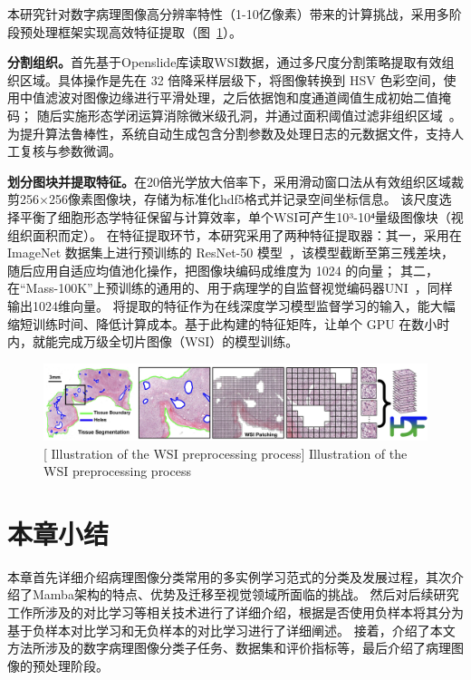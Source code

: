 本研究针对数字病理图像高分辨率特性（1-10亿像素）带来的计算挑战，采用多阶段预处理框架实现高效特征提取（图~\ref{figure1: 数字病理图像的预处理过程示意图}）。

\textbf{分割组织。}首先基于Openslide库读取WSI数据，通过多尺度分割策略提取有效组织区域。具体操作是先在 32 倍降采样层级下，将图像转换到 HSV 色彩空间，使用中值滤波对图像边缘进行平滑处理，之后依据饱和度通道阈值生成初始二值掩码；
随后实施形态学闭运算消除微米级孔洞，并通过面积阈值过滤非组织区域~\cite{lu2021data}。
为提升算法鲁棒性，系统自动生成包含分割参数及处理日志的元数据文件，支持人工复核与参数微调。

\textbf{划分图块并提取特征。}在20倍光学放大倍率下，采用滑动窗口法从有效组织区域裁剪256×256像素图像块，存储为标准化hdf5格式并记录空间坐标信息。
该尺度选择平衡了细胞形态学特征保留与计算效率，单个WSI可产生10³-10⁴量级图像块（视组织面积而定）。
在特征提取环节，本研究采用了两种特征提取器：其一，采用在 ImageNet 数据集上进行预训练的 ResNet-50 模型~\cite{he2016deep}，该模型截断至第三残差块，随后应用自适应均值池化操作，把图像块编码成维度为 1024 的向量；
其二， 在“Mass-100K”上预训练的通用的、用于病理学的自监督视觉编码器UNI~\cite{chen2024towards}，同样输出1024维向量。
将提取的特征作为在线深度学习模型监督学习的输入，能大幅缩短训练时间、降低计算成本。基于此构建的特征矩阵，让单个 GPU 在数小时内，就能完成万级全切片图像（WSI）的模型训练。

\begin{figure}[h]
    \centering
    \includegraphics[width=1.0\columnwidth]{figures/RelatedWork/CLAM1.jpg}
    [ Illustration of the WSI preprocessing process]{ Illustration of the WSI preprocessing process~\cite{lu2021data}}
    \label{figure1: 数字病理图像的预处理过程示意图}
\end{figure}
\section[\hspace{-2pt}本章小结]{{\heiti{} \hspace{-8pt}本章小结}}\label{section2: 本章小结}

本章首先详细介绍病理图像分类常用的多实例学习范式的分类及发展过程，其次介绍了Mamba架构的特点、优势及迁移至视觉领域所面临的挑战。
然后对后续研究工作所涉及的对比学习等相关技术进行了详细介绍，根据是否使用负样本将其分为基于负样本对比学习和无负样本的对比学习进行了详细阐述。
接着，介绍了本文方法所涉及的数字病理图像分类子任务、数据集和评价指标等，最后介绍了病理图像的预处理阶段。

